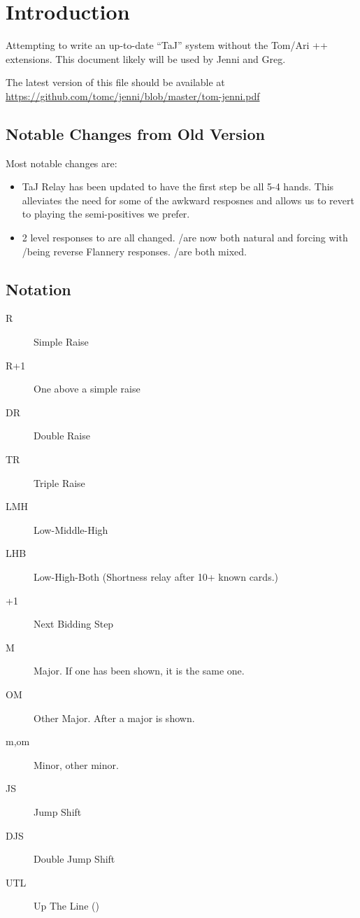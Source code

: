 \documentclass[tom-jenni]{subfile}
\begin{document}
\chapter{Introduction}

Attempting to write an up-to-date ``TaJ'' system without the Tom/Ari ++ extensions.  This document likely will be used by Jenni and Greg.

The latest version of this file should be available at \url{https://github.com/tomc/jenni/blob/master/tom-jenni.pdf}

\section{Notable Changes from Old Version}

Most notable changes are:

\begin{itemize}
	\item TaJ Relay has been updated to have the first step be all 5-4 hands.  This alleviates the need for some of the awkward  resposnes and allows us to revert to playing the semi-positives we prefer.
	\item 2 level responses to  are all changed.  /\ddd are now both natural and forcing with /\sss being reverse Flannery responses. /\ddd are both mixed.
\end{itemize}

\section{Notation}

\begin{description}
	\item[R] Simple Raise
	\item[R+1] One above a simple raise
	\item[DR] Double Raise
	\item[TR] Triple Raise
	\item[LMH] Low-Middle-High
	\item[LHB] Low-High-Both (Shortness relay after 10+ known cards.)
	\item[+1] Next Bidding Step
	\item[M] Major.  If one has been shown, it is the same one.
	\item[OM] Other Major.  After a major is shown.
	\item[m,om] Minor, other minor.
	\item[JS] Jump Shift
	\item[DJS] Double Jump Shift
	\item[UTL] Up The Line (\ccc\ddd\hhh\sss)
\end{description}
\end{document}
